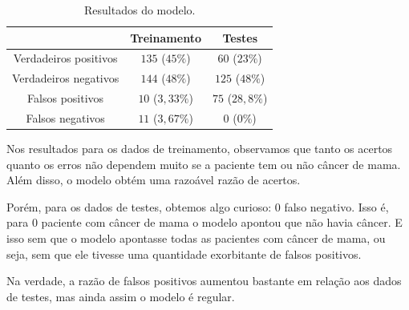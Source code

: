 \documentclass[11pt]{article}
\begin{document}
\begin{enumerate}
\begin{table}[H]
    \centering
    \begin{tabular}{|c||c|c|}
    \hline
                            & Treinamento       & Testes            \\
    \hline \hline
    Verdadeiros positivos   & $135$ ($45\%$)    & $60$ ($23\%$)     \\
    \hline
    Verdadeiros negativos   & $144$ ($48\%$)    & $125$ ($48\%$)    \\
    \hline
    Falsos positivos        & $10$ ($3,33\%$)   & $75$ ($28,8\%$)   \\
    \hline
    Falsos negativos        & $11$ ($3,67\%$)   & $0$ ($0\%$)       \\
    \hline
    \end{tabular}
    \caption{Resultados do modelo.}
\end{table}

Nos resultados para os dados de treinamento, observamos que tanto os acertos quanto os erros não dependem muito se a paciente tem ou não câncer de mama. Além disso, o modelo obtém uma razoável razão de acertos.

Porém, para os dados de testes, obtemos algo curioso: $0$ falso negativo. Isso é, para $0$ paciente com câncer de mama o modelo apontou que não havia câncer. E isso sem que o modelo apontasse todas as pacientes com câncer de mama, ou seja, sem que ele tivesse uma quantidade exorbitante de falsos positivos.

Na verdade, a razão de falsos positivos aumentou bastante em relação aos dados de testes, mas ainda assim o modelo é regular.

\end{enumerate}
\end{document}
